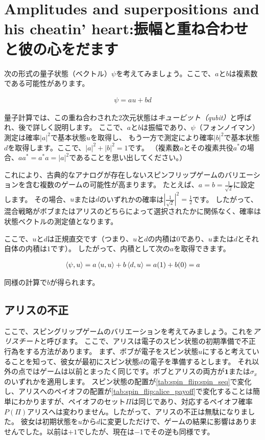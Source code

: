 \section{Amplitudes and superpositions and his cheatin' heart:振幅と重ね合わせと彼の心をだます}

次の形式の量子状態（ベクトル）$\psi$を考えてみましょう。ここで、$a$と$b$は複素数である可能性があります。

\begin{align}
\psi = au + bd
\end{align}

量子計算では、この重ね合わされた2次元状態は\emph{キュービット（qubit）}と呼ばれ、後で詳しく説明します。
ここで、$a$と$b$は振幅であり、$\psi$（フォンノイマン）測定は確率$|a|^2$で基本状態$u$を取得し、
もう一方で測定により確率$|b|^2$で基本状態$d$を取得します。ここで、$|a|^2 + |b|^2 = 1$です。
（複素数$a$とその複素共役$a^{\ast}$の場合、$aa^{\ast} = a^{\ast} a = |a|^2$であることを思い出してください。）

これにより、古典的なアナログが存在しないスピンフリップゲームのバリエーションを含む複数のゲームの可能性が高まります。
たとえば、$a = b = \frac{1}{\sqrt{2}}$に設定します。
その場合、$u$または$d$のいずれかの確率は$\left|\frac{1}{\sqrt{2}}\right|^2 = \frac{1}{2}$です。
したがって、混合戦略がボブまたはアリスのどちらによって選択されたかに関係なく、確率は状態ベクトルの測定値となります。

ここで、$u$と$d$は正規直交です（つまり、$u$と$d$の内積は$0$であり、$u$または$d$とそれ自体の内積は$1$です）。
したがって、内積として次の$a$を取得できます。 

\begin{align}
\braket{\psi, u} = a \braket{u, u} + b \braket{d, u} = a(1) +b(0) =  a
\end{align}

同様の計算で$b$が得られます。

\subsection{アリスの不正} %

ここで、スピングリップゲームのバリエーションを考えてみましょう。これを\emph{アリスチート}と呼びます。
ここで、アリスは電子のスピン状態の初期準備で不正行為をする方法があります。
まず、ボブが電子をスピン状態$u$にすると考えていることを知って、彼女が最初にスピン状態$d$の電子を準備するとします。
それ以外の点ではゲームは以前とまったく同じです。ボブとアリスの両方が$\textbf{1}$または$\sigma_x$のいずれかを適用します。
スピン状態の配置が\autoref{tab:spin_flip:spin_seq}で変化し、アリスへのペイオフの配置が\autoref{tab:spin_flip:alice_payoff}で変化することは簡単にわかりますが、ペイオフのセット$\Pi$は同じであり、対応するペイオフ確率$P(\Pi)$アリスへは変わりません。したがって、アリスの不正は無駄になりました。
彼女は初期状態を$u$から$d$に変更しただけで、ゲームの結果に影響はありませんでした。以前は$+1$でしたが、現在は$-1$でその逆も同様です。

